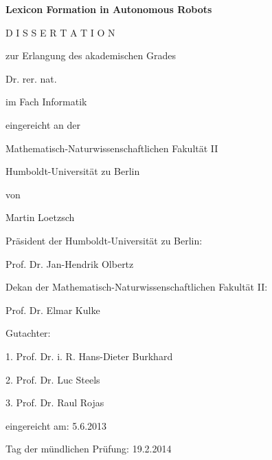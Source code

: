 

\sffamily

\centerline{\bfseries\Large Lexicon Formation in Autonomous Robots}

\vspace{1.5cm}

\large 
\centerline{D I S S E R T A T I O N}

\vspace{0.2cm}

\centerline{zur Erlangung des akademischen Grades}

\vspace{0.2cm}

\centerline{Dr. rer. nat.}
\centerline{im Fach Informatik}

\vspace{0.8cm}

\centerline{eingereicht an der}

\vspace{0.2cm}

\centerline{Mathematisch-Naturwissenschaftlichen Fakultät II}
\centerline{Humboldt-Universität zu Berlin}

\vspace{0.8cm}

\centerline{von}
\centerline{\sffamily Martin Loetzsch}


\vspace{2cm}

\rmfamily

Präsident der Humboldt-Universität zu Berlin:

Prof. Dr. Jan-Hendrik Olbertz

\vspace{0.5cm}

Dekan der Mathematisch-Naturwissenschaftlichen Fakultät II:

Prof. Dr. Elmar Kulke

\vspace{0.5cm}


Gutachter:

1. Prof. Dr. i. R. Hans-Dieter Burkhard

2. Prof. Dr. Luc Steels

3. Prof. Dr. Raul Rojas


\vspace{0.5cm}

eingereicht am: 5.6.2013

Tag der mündlichen Prüfung: 19.2.2014

\normalsize

\cleardoublepage

